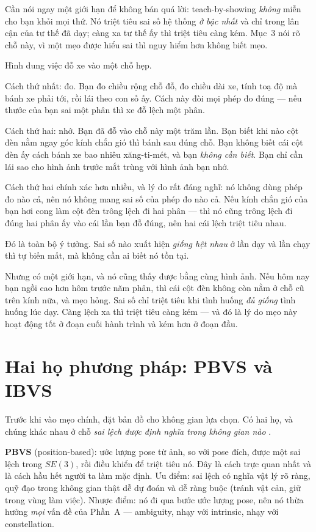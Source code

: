 \documentclass[../../marker.tex]{subfiles}
\begin{document}
Cần nói ngay một giới hạn để không bán quá lời: teach-by-showing \emph{không} miễn cho bạn khỏi mọi thứ. Nó triệt tiêu sai số hệ thống \emph{ở bậc nhất} và chỉ trong lân cận của tư thế đã dạy; càng xa tư thế ấy thì triệt tiêu càng kém. Mục~3 nói rõ chỗ này, vì một mẹo được hiểu sai thì nguy hiểm hơn không biết mẹo.

\begin{trucgiac}
Hình dung việc đỗ xe vào một chỗ hẹp.

Cách thứ nhất: đo. Bạn đo chiều rộng chỗ đỗ, đo chiều dài xe, tính toạ độ mà bánh xe phải tới, rồi lái theo con số ấy. Cách này đòi mọi phép đo đúng --- nếu thước của bạn sai một phân thì xe đỗ lệch một phân.

Cách thứ hai: nhớ. Bạn đã đỗ vào chỗ này một trăm lần. Bạn biết khi nào cột đèn nằm ngay góc kính chắn gió thì bánh sau đúng chỗ. Bạn không biết cái cột đèn ấy cách bánh xe bao nhiêu xăng-ti-mét, và bạn \emph{không cần biết}. Bạn chỉ cần lái sao cho hình ảnh trước mắt trùng với hình ảnh bạn nhớ.

Cách thứ hai chính xác hơn nhiều, và lý do rất đáng nghĩ: nó không dùng phép đo nào cả, nên nó không mang sai số của phép đo nào cả. Nếu kính chắn gió của bạn hơi cong làm cột đèn trông lệch đi hai phân --- thì nó cũng trông lệch đi đúng hai phân ấy vào cái lần bạn đỗ đúng, nên hai cái lệch triệt tiêu nhau.

Đó là toàn bộ ý tưởng. Sai số nào xuất hiện \emph{giống hệt nhau} ở lần dạy và lần chạy thì tự biến mất, mà không cần ai biết nó tồn tại.

Nhưng có một giới hạn, và nó cũng thấy được bằng cùng hình ảnh. Nếu hôm nay bạn ngồi cao hơn hôm trước năm phân, thì cái cột đèn không còn nằm ở chỗ cũ trên kính nữa, và mẹo hỏng. Sai số chỉ triệt tiêu khi tình huống \emph{đủ giống} tình huống lúc dạy. Càng lệch xa thì triệt tiêu càng kém --- và đó là lý do mẹo này hoạt động tốt ở đoạn cuối hành trình và kém hơn ở đoạn đầu.
\end{trucgiac}

\section{Hai họ phương pháp: PBVS và IBVS}

Trước khi vào mẹo chính, đặt bản đồ cho không gian lựa chọn. Có hai họ, và chúng khác nhau ở chỗ \emph{sai lệch được định nghĩa trong không gian nào} \cite{chaumette2006visual1}.

\textbf{PBVS} (position-based): ước lượng pose từ ảnh, so với pose đích, được một sai lệch trong \(SE(3)\), rồi điều khiển để triệt tiêu nó. Đây là cách trực quan nhất và là cách hầu hết người ta làm mặc định. Ưu điểm: sai lệch có nghĩa vật lý rõ ràng, quỹ đạo trong không gian thật dễ dự đoán và dễ ràng buộc (tránh vật cản, giữ trong vùng làm việc). Nhược điểm: nó đi qua bước ước lượng pose, nên nó thừa hưởng \emph{mọi} vấn đề của Phần~A --- ambiguity, nhạy với intrinsic, nhạy với constellation.
\end{document}
